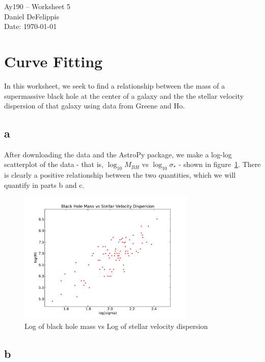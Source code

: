 \documentclass[11pt,letterpaper]{article}
\begin{document}
\begin{center}
\Large
Ay190 -- Worksheet 5\\
Daniel DeFelippis\\
Date: \today
\end{center}


\section{Curve Fitting}
In this worksheet, we seek to find a relationship between the 
mass of a supermassive black hole at the center of a galaxy 
and the the stellar velocity dispersion of that galaxy using 
data from Greene and Ho. 

\subsection*{a}

After downloading the data and the AstroPy package, we make a
log-log scatterplot of the data - that is, $\log_{10}M_{BH}$ vs 
$\log_{10} \sigma_{*}$ - shown in figure~\ref{fig:5a}. There is clearly
a positive relationship between the two quantities, which we will
quantify in parts b and c.

\begin{figure}[bth]
\centering
\includegraphics[width=0.75\textwidth]{ws5-a.pdf}
\caption{Log of black hole mass vs Log of stellar velocity dispersion}
\label{fig:5a}
\end{figure}


\subsection*{b}
\end{document}

